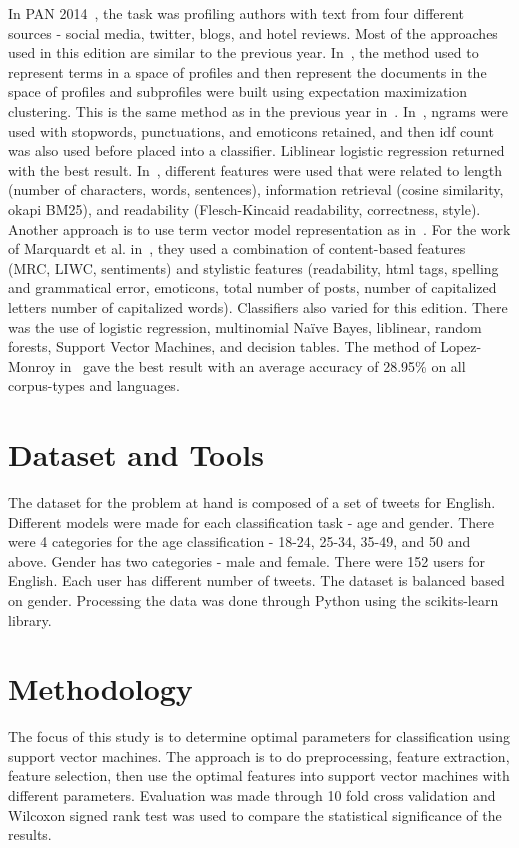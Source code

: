 \documentclass[a4paper]{llncs}
\begin{document}
In PAN 2014~\cite{rangel2014overview}, the task was profiling authors with text from four different sources - social media, twitter, blogs, and hotel reviews. Most of the approaches used in this edition are similar to the previous year. In~\cite{lopezusing}, the method used to represent terms in a space of profiles and then represent the documents in the space of profiles and subprofiles were built using expectation maximization clustering. This is the same method as in the previous year in~\cite{lopez2013inaoe}. In~\cite{maharjansimple}, ngrams were used with stopwords, punctuations, and emoticons retained, and then idf count was also used before placed into a classifier. Liblinear logistic regression returned with the best result. In~\cite{weren6exploring}, different features were used that were related to length (number of characters, words, sentences), information retrieval (cosine similarity, okapi BM25), and readability (Flesch-Kincaid readability, correctness, style). Another approach is to use term vector model representation as in~\cite{villenadaedalus}. For the work of Marquardt et al. in~\cite{marquardt2014age}, they used a combination of content-based features (MRC, LIWC, sentiments) and stylistic features (readability, html tags, spelling and grammatical error, emoticons, total number of posts, number of capitalized letters number of capitalized words). Classifiers also varied for this edition. There was the use of logistic regression, multinomial Naïve Bayes, liblinear, random forests, Support Vector Machines, and decision tables. The method of Lopez-Monroy in~\cite{lopezusing} gave the best result with an average accuracy of 28.95\% on all corpus-types and languages. 

\section{Dataset and Tools}
The dataset for the problem at hand is composed of a set of tweets for English. Different models were made for each classification task - age and gender. There were 4 categories for the age classification - 18-24, 25-34, 35-49, and 50 and above. Gender has two categories - male and female. There were 152 users for English. Each user has different number of tweets. The dataset is balanced based on gender. Processing the data was done through Python using the scikits-learn~\cite{scikit-learn} library. 

\section{Methodology}
The focus of this study is to determine optimal parameters for classification using support vector machines. The approach is to do preprocessing, feature extraction, feature selection, then use the optimal features into support vector machines with different parameters. Evaluation was made through 10 fold cross validation and Wilcoxon signed rank test was used to compare the statistical significance of the results. 
\end{document}
